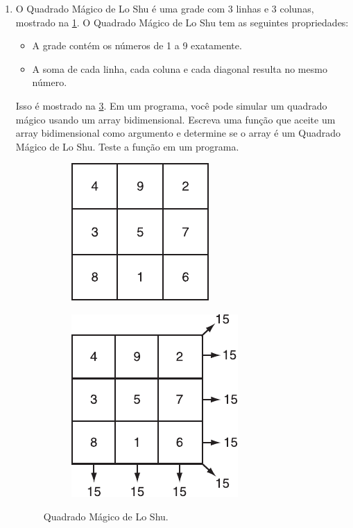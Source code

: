 \documentclass[12pt]{article}
\begin{document}
\begin{enumerate}
      \item O Quadrado Mágico de Lo Shu é uma grade com 3 linhas e 3 colunas, mostrado na \ref{fig:1}. O Quadrado Mágico de Lo Shu tem as seguintes propriedades:
            \begin{itemize}
                  \item A grade contém os números de 1 a 9 exatamente.
                  \item A soma de cada linha, cada coluna e cada diagonal resulta no mesmo número.
            \end{itemize}

            Isso é mostrado na \ref{fig:2}. Em um programa, você pode simular um quadrado mágico usando um array bidimensional. Escreva uma função que aceite um array bidimensional como argumento e determine se o array é um Quadrado Mágico de Lo Shu. Teste a função em um programa.

            \begin{figure}[htb]
                  \hfil
                  \begin{subfigure}[c]{0.45\linewidth}
                        \centering
                        \includegraphics[scale=1.2]{2_lista_1_fig.pdf}
                        \caption{}
                        \label{fig:1}
                  \end{subfigure}
                  \hfil
                  \begin{subfigure}[c]{0.45\linewidth}
                        \centering
                        \includegraphics[scale=1.2]{2_lista_2_fig.pdf}
                        \caption{}
                        \label{fig:2}
                  \end{subfigure}
                  \hfil
                  \caption{Quadrado Mágico de Lo Shu.}
            \end{figure}

\end{enumerate}
\end{document}
